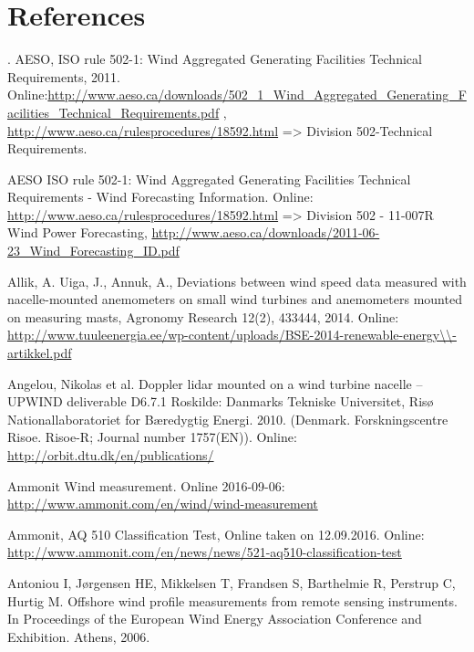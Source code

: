 \chapter*{References}\label{references}
\setlength{\parindent}{-1cm}
.
AESO, ISO rule 502-1: Wind Aggregated Generating Facilities Technical Requirements, 2011. Online:\small{\url{http://www.aeso.ca/downloads/502_1_Wind_Aggregated_Generating_Facilities_Technical_Requirements.pdf}} , \small{\url{http://www.aeso.ca/rulesprocedures/18592.html}} => Division 502-Technical Requirements.  

AESO ISO rule 502-1: Wind Aggregated Generating Facilities Technical Requirements - Wind Forecasting Information. Online: \small{\url{http://www.aeso.ca/rulesprocedures/18592.html}} => Division 502 - 11-007R Wind Power Forecasting, \small{\url{http://www.aeso.ca/downloads/2011-06-23_Wind_Forecasting_ID.pdf}}

Allik, A. Uiga, J., Annuk, A.,  Deviations between wind speed data measured with nacelle-mounted anemometers on small wind turbines and anemometers mounted on measuring masts, Agronomy Research 12(2), 433­444, 2014.                      
Online: \small{\url{http://www.tuuleenergia.ee/wp-content/uploads/BSE-2014-renewable-energy\\-artikkel.pdf}}


Angelou, Nikolas et al. Doppler lidar mounted on a wind turbine nacelle – UPWIND deliverable D6.7.1 Roskilde: Danmarks Tekniske Universitet, Risø Nationallaboratoriet for Bæredygtig Energi. 2010. (Denmark. Forskningscentre Risoe. Risoe-R; Journal number 1757(EN)). 
Online: \small{\url{http://orbit.dtu.dk/en/publications/}}


Ammonit Wind measurement. Online 2016-09-06:                          
\small{\url{http://www.ammonit.com/en/wind/wind-measurement}}


Ammonit, AQ 510 Classification Test, Online taken on 12.09.2016. Online: \small{\url{http://www.ammonit.com/en/news/news/521-aq510-classification-test}}


Antoniou I, Jørgensen HE, Mikkelsen T, Frandsen S, Barthelmie R, Perstrup C, Hurtig M. Offshore wind profile measurements from remote sensing instruments. In Proceedings of the European Wind Energy Association Conference and Exhibition. Athens, 2006.

